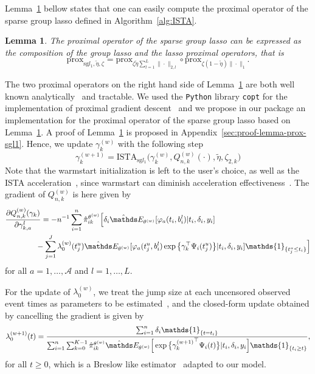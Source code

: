\documentclass[11pt]{article}
\newtheorem{lemma}{Lemma}
\newcommand{\ind}[1]{\mathds{1}_{#1}}
\newcommand{\norm}[1]{\|#1\|}
\newcommand{\E}{\mathds E}
\begin{document}
\vspace{.5cm}
Lemma~\ref{lemma:prox-sgl1} bellow states that one can easily compute the proximal operator of the sparse group lasso defined in Algorithm~\ref{alg:ISTA}.
\begin{lemma}
\label{lemma:prox-sgl1}
The proximal operator of the sparse group lasso can be expressed as the composition of the group lasso and the lasso proximal operators, that is
\normalfont
\begin{equation*}
  \text{prox}_{\text{sg} l_1,\tilde \eta, \zeta} = \text{prox}_{\zeta \tilde \eta \sum_{l=1}^L \norm{\cdot}_{2,l}} \circ \text{prox}_{\zeta (1 - \tilde \eta) \norm{\cdot}_1}.
\end{equation*}
\end{lemma}
The two proximal operators on the right hand side of Lemma~\ref{lemma:prox-sgl1} are both well known analytically~\citep{bach2011optimization} and tractable. We used the \texttt{Python} library \texttt{copt} for the implementation of proximal gradient descent~\citep{copt} and we propose in our package an implementation for the proximal operator of the sparse group lasso based on Lemma~\ref{lemma:prox-sgl1}.
A proof of Lemma~\ref{lemma:prox-sgl1} is proposed in Appendix~\ref{sec:proof-lemma-prox-sgl1}.
Hence, we update $\gamma_k^{(w)}$ with the following step
\begin{equation}
  \label{eq:gamma-update}
  \gamma_k^{(w+1)} = \text{ISTA}_{\text{sg} l_1}\big(\gamma_k^{(w)}, Q^{(w)}_{n,k}(\cdot), \tilde \eta, \zeta_{2,k}\big)
\end{equation}
Note that the warmstart initialization is left to the user's choice, as well as the ISTA acceleration~\citep{beck2009fast}, since warmstart can diminish acceleration effectiveness~\citep{tibshirani2010proximal}. The gradient of $Q_{n,k}^{(w)}$ is here given by
\begin{align}
  \label{eq:grad-Q}
  &\frac{\partial Q_{n,k}^{(w)}(\gamma_k)}{\partial \gamma_{k,a}^l} = -n^{-1} \sum_{i=1}^n \hat \pi_{ik}^{\theta^{(w)}} \Big[ \delta_i  \hat \E_{\theta^{(w)}}[ \varphi_a(t_i, b_i^l) | t_i, \delta_i, y_i] \\ \nonumber
   &\qquad\qquad - \sum_{j=1}^J \lambda_0^{(w)}(t_j^u) \hat \E_{\theta^{(w)}}[ \varphi_a(t_j^u, b_i^l) \exp \big\{\gamma_k^\top \Psi_i(t_j^u)\big\} | t_i, \delta_i, y_i] \ind{\{t_j^u \leq t_i\}} \Big]
\end{align}
for all $a = 1, \ldots, \mathcal{A}$ and $l = 1, \ldots, L$.

For the update of $\lambda_0^{(w)}$, we treat the jump size at each uncensored observed event times as parameters to be estimated~\citep{klein1992semiparametric}, and the closed-form update obtained by cancelling the gradient is given by
\begin{equation}
  \label{eq:update_lambda_0}
  \lambda_0^{(w+1)}(t)= \dfrac{\sum_{i=1}^n \delta_i \ind{\{t=t_i\}}}{\sum_{i=1}^n \sum_{k=0}^{K-1} \hat \pi_{ik}^{\theta^{(w)}} \hat \E_{\theta^{(w)}}\Big[\exp \big\{{\gamma_k^{(w+1)}}^\top \Psi_i(t)\big\} | t_i, \delta_i, y_i \Big] \ind{\{t_i \geq t\}} },
\end{equation}
for all $t \geq 0$, which is a Breslow like estimator~\citep{breslow1972contribution} adapted to our model. 
\end{document}
